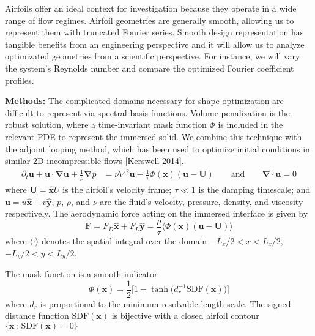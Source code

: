 \documentclass[11pt]{article}
\renewcommand{\vec}[1]{\boldsymbol{#1}}
\newcommand{\grad}{\vec{\nabla}}
\newcommand{\laplacian}{\nabla^2}
\begin{document}
Airfoils offer an ideal context for investigation because they operate in a wide range of flow regimes. Airfoil geometries are generally smooth, allowing us to represent them with truncated Fourier series. Smooth design representation has tangible benefits from an engineering perspective and it will allow us to analyze optimizated geometries from a scientific perspective. For instance, we will vary the system's Reynolds number and compare the optimized Fourier coefficient profiles.


\textbf{Methods:} The complicated domains necessary for shape optimization are difficult to represent via spectral basis functions. 
Volume penalization is the robust solution, where a time-invariant mask function $\Phi$ is included in the relevant PDE to represent the immersed solid. We combine this technique with the adjoint looping method, which has been used to optimize initial conditions in similar 2D incompressible flows [Kerswell 2014].
\begin{align}
  \partial_t \vec{u} + \vec{u}\cdot\grad\vec{u} + \frac{1}{\rho}\grad p &= \nu\laplacian\vec{u} - \frac{1}{\tau}\Phi(\vec{x})(\vec{u} - \vec{U}) \qquad \text{and} \qquad \grad \cdot \vec{u} = 0 \label{eq:ns}
\end{align}
where $\vec{U} = \vec{\hat{x}}U$ is the airfoil's velocity frame; $\tau \ll 1$ is the damping timescale; and $\vec{u} = u\vec{\hat{x}} + v\vec{\hat{y}}$, $p$, $\rho$, and $\nu$ are the fluid's velocity, pressure, density, and viscosity respectively.
The aerodynamic force acting on the immersed interface is given by
\begin{equation}
  \vec{F} = F_D\hat{\vec{x}} + F_L\hat{\vec{y}} = \frac{\rho}{\tau}\langle \Phi(\vec{x}) (\vec{u} - \vec{U}) \rangle
\end{equation}
where $\langle \cdot \rangle$ denotes the spatial integral over the domain $-L_x/2<x<L_x/2$, $-L_y/2<y<L_y/2$.

\newpage
\indent The mask function is a smooth indicator
\begin{equation}
  \Phi(\vec{x}) = \frac{1}{2}\big[ 1 - \tanh\big(d^{-1}_r\mathrm{SDF}(\vec{x})\big) \big]
\end{equation} 
where $d_r$ is proportional to the minimum resolvable length scale. The signed distance function $\mathrm{SDF}(\vec{x})$ is bijective with a closed airfoil contour $\{ \vec{x}\, : \, \mathrm{SDF}(\vec{x}) = 0 \}$ \\
  
\end{document}
